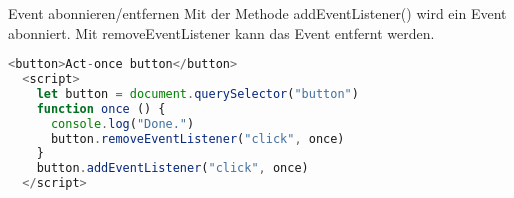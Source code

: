 \begin{code}{Event abonnieren/entfernen}
    Mit der Methode addEventListener() wird ein Event abonniert. Mit removeEventListener kann das Event entfernt werden.
  \begin{lstlisting}[language=JavaScript, style=basesmol]
  <button>Act-once button</button>
  <script>
    let button = document.querySelector("button")
    function once () {
      console.log("Done.")
      button.removeEventListener("click", once)
    }
    button.addEventListener("click", once)
  </script>
  \end{lstlisting}
  \end{code}
